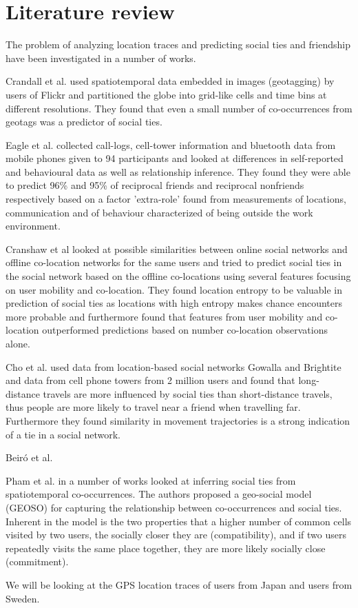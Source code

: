 \chapter{Literature review}
\label{chap:literature_review}
The problem of analyzing location traces and predicting social ties and friendship have been investigated in a number of works.

Crandall et al.\cite{ISTfGC} used spatiotemporal data embedded in images (geotagging) by users of Flickr and partitioned the globe into grid-like cells and time bins at different resolutions. They found that even a small number of co-occurrences from geotags was a predictor of social ties.

Eagle et al.\cite{eagle} collected call-logs, cell-tower information and bluetooth data from mobile phones given to 94 participants and looked at differences in self-reported and behavioural data as well as relationship inference. They found they were able to predict 96\% and 95\% of reciprocal friends and reciprocal nonfriends respectively based on a factor 'extra-role' found from measurements of locations, communication and of behaviour characterized of being outside the work environment.

Cranshaw et al\cite{cranshaw2010bridging} looked at possible similarities between online social networks and offline co-location networks for the same users and tried to predict social ties in the social network based on the offline co-locations using several features focusing on user mobility and co-location. They found location entropy to be valuable in prediction of social ties as locations with high entropy makes chance encounters more probable and furthermore found that features from user mobility and co-location outperformed predictions based on number co-location observations alone.

Cho et al.\cite{FaMUMiLBSN} used data from location-based social networks Gowalla and Brightite and data from cell phone towers from 2 million users and found that long-distance travels are more influenced by social ties than short-distance travels, thus people are more likely to travel near a friend when travelling far. Furthermore they found similarity in movement trajectories is a strong indication of a tie in a social network.

Beiró et al. \cite{human_mob_through_assi}

Pham et al. in a number of works looked at inferring social ties from spatiotemporal co-occurrences\cite{pham2011towards}\cite{iRWRfSD}. The authors proposed a geo-social model (GEOSO) for capturing the relationship between co-occurrences and social ties. Inherent in the model is the two properties that a higher number of common cells visited by two users, the socially closer they are (compatibility), and if two users repeatedly visits the same place together, they are more likely socially close (commitment).

We will be looking at the GPS location traces of \numberUsersJapan{} users from Japan and \numberUsersSweden{} users from Sweden.